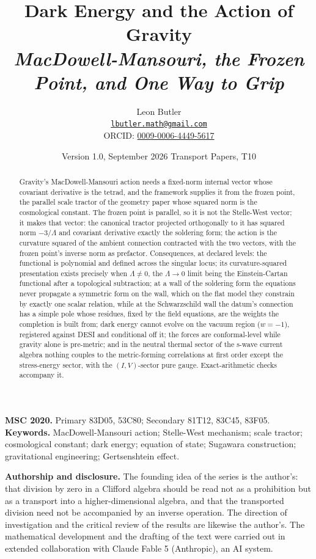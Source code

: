 \documentclass[11pt]{article}
\title{\bfseries Dark Energy and the Action of Gravity\\[4pt]
  \large\itshape MacDowell-Mansouri, the Frozen Point, and One Way to Grip}
\author{Leon Butler\\ \normalsize\href{mailto:lbutler.math@gmail.com}{\texttt{lbutler.math@gmail.com}}\\ \normalsize ORCID: \href{https://orcid.org/0009-0006-4449-5617}{0009-0006-4449-5617}}
\date{Version 1.0, September 2026 \textperiodcentered{} Transport Papers, T10}
\theoremstyle{definition}
\begin{document}
\maketitle

\begin{abstract}
\normalsize
Gravity's MacDowell-Mansouri action needs a fixed-norm internal vector whose covariant derivative is the tetrad, and the framework supplies it from the frozen point, the parallel scale tractor of the geometry paper whose squared norm is the cosmological constant. The frozen point is parallel, so it is not the Stelle-West vector; it makes that vector: the canonical tractor projected orthogonally to it has squared norm $-3/\Lambda$ and covariant derivative exactly the soldering form; the action is the curvature squared of the ambient connection contracted with the two vectors, with the frozen point's inverse norm as prefactor. Consequences, at declared levels: the functional is polynomial and defined across the singular locus; its curvature-squared presentation exists precisely when $\Lambda \neq 0$, the $\Lambda \to 0$ limit being the Einstein-Cartan functional after a topological subtraction; at a wall of the soldering form the equations never propagate a symmetric form on the wall, which on the flat model they constrain by exactly one scalar relation, while at the Schwarzschild wall the datum's connection has a simple pole whose residues, fixed by the field equations, are the weights the completion is built from; dark energy cannot evolve on the vacuum region ($w = -1$), registered against DESI and conditional off it; the forces are conformal-level while gravity alone is pre-metric; and in the neutral thermal sector of the s-wave current algebra nothing couples to the metric-forming correlations at first order except the stress-energy sector, with the $(I,V)$-sector pure gauge. Exact-arithmetic checks accompany it.
\end{abstract}

\medskip
\noindent\textbf{MSC 2020.} Primary 83D05, 53C80; Secondary 81T12, 83C45, 83F05.\\
\textbf{Keywords.} MacDowell-Mansouri action; Stelle-West mechanism; scale tractor; cosmological constant; dark energy; equation of state; Sugawara construction; gravitational engineering; Gertsenshtein effect.

\newpage
\textbf{Authorship and disclosure. }The founding idea of the series is the author's: that division by zero in a Clifford algebra should be read not as a prohibition but as a transport into a higher-dimensional algebra, and that the transported division need not be accompanied by an inverse operation. The direction of investigation and the critical review of the results are likewise the author's. The mathematical development and the drafting of the text were carried out in extended collaboration with Claude Fable 5 (Anthropic), an AI system.
\end{document}
